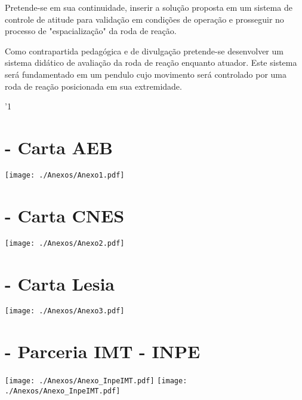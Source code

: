  Pretende-se em sua continuidade, inserir a solução proposta em um sistema de controle de atitude para validação em condições de operação e prosseguir no processo de "espacialização"  da roda de reação.

Como contrapartida pedagógica e de divulgação  pretende-se desenvolver um sistema didático de avaliação da roda de reação enquanto atuador. Este sistema será fundamentado em um pendulo cujo movimento será controlado por uma roda de reação posicionada em sua extremidade. 




\newpage
\apptocmd{\thebibliography}{\footnotesize}{}{}
'1


\newpage
{} %

\appendix
\section{- Carta AEB} \label{Anexo_1}
		\texttt{[image: ./Anexos/Anexo1.pdf]}

\newpage
\section{- Carta CNES} \label{Anexo_2}
		\texttt{[image: ./Anexos/Anexo2.pdf]}
	
\newpage
\section{- Carta Lesia} \label{Anexo_3}
		\texttt{[image: ./Anexos/Anexo3.pdf]}
		
\newpage
\section{- Parceria IMT - INPE} \label{Anexo_INPE}
		\texttt{[image: ./Anexos/Anexo\_InpeIMT.pdf]}	
		\texttt{[image: ./Anexos/Anexo\_InpeIMT.pdf]}		
	
		
